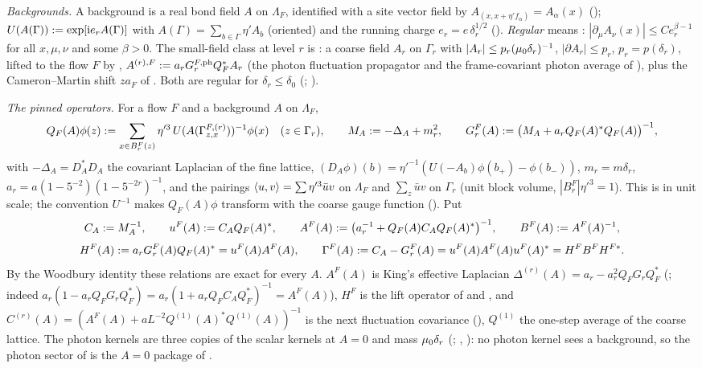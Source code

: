 \emph{Backgrounds.} A background is a real bond field $A$ on $\Lambda_F$, identified with a site vector field by $A_{(x,x+\eta'f_\alpha)}=A_\alpha(x)$ (\cite[p.~652]{K1}); $U(A(\Gamma)):=\exp[\mathrm ie_rA(\Gamma)]$ with $A(\Gamma)=\sum_{b\in\Gamma}\eta'A_b$ (oriented) and the running charge $e_r=e\,\delta_r^{1/2}$ (\cite[(3.22)]{K1}). \emph{Regular} means \cite[Def.~3.2]{K1}: $|\partial_\mu A_\nu(x)|\le Ce_r^{\beta-1}$ for all $x,\mu,\nu$ and some $\beta>0$. The small-field class at level $r$ is \cite[(3.2)]{K1}: a coarse field $A_r$ on $\Gamma_r$ with $|A_r|\le p_r(\mu_0\delta_r)^{-1}$, $|\partial A_r|\le p_r$, $p_r=p(\delta_r)$, lifted to the flow $F$ by \cite[(2.18)]{K1}, $A^{(r),F}:= a_rG^{F,\mathrm{ph}}_rQ_F^*A_r$ (the photon fluctuation propagator and the frame-covariant photon average of ), plus the Cameron--Martin shift $za_F$ of . Both are regular for $\delta_r\le\delta_0$ (\cite[(3.45)]{K1}; ).

\emph{The pinned operators.} For a flow $F$ and a background $A$ on $\Lambda_F$,
\[
Q_F(A)\phi(z):=\sum_{x\in B^F_r(z)}\eta'^3\,U(A(\Gamma^{F,(r)}_{z,x}))^{-1}\phi(x)\quad(z\in\Gamma_r),\qquad
M_A:=-\Delta_A+m_r^2,\qquad G^F_r(A):=\big(M_A+a_rQ_F(A)^*Q_F(A)\big)^{-1},
\]
with $-\Delta_A=D_A^*D_A$ the covariant Laplacian of the fine lattice, $(D_A\phi)(b)=\eta'^{-1}(U(-A_b)\phi(b_+)-\phi(b_-))$, $m_r=m\delta_r$, $a_r=a(1-5^{-2})(1-5^{-2r})^{-1}$, and the pairings $\langle u,v\rangle=\sum\eta'^3\bar uv$ on $\Lambda_F$ and $\sum_z\bar uv$ on $\Gamma_r$ (unit block volume, $|B^F_r|\eta'^3=1$). This is \cite[(2.11), (2.13)]{K1} in unit scale; the convention $U^{-1}$ makes $Q_F(A)\phi$ transform with the coarse gauge function (). Put
\[
C_A:= M_A^{-1},\qquad u^F(A):= C_AQ_F(A)^*,\qquad A^F(A):=\big(a_r^{-1}+Q_F(A)C_AQ_F(A)^*\big)^{-1},\qquad B^F(A):= A^F(A)^{-1},
\]
\[
H^F(A):= a_rG^F_r(A)Q_F(A)^*=u^F(A)A^F(A),\qquad \Gamma^F(A):= C_A-G^F_r(A)=u^F(A)A^F(A)u^F(A)^*=H^FB^FH^{F*}.
\]
By the Woodbury identity these relations are exact for every $A$. $A^F(A)$ is King's effective Laplacian $\Delta^{(r)}(A)=a_r-a_r^2Q_FG_rQ_F^*$ (\cite[(2.14)]{K1}; indeed $a_r(1-a_rQ_FG_rQ_F^*)=a_r(1+a_rQ_FC_AQ_F^*)^{-1}=A^F(A)$), $H^F$ is the lift operator of \cite[(2.18)]{K1} and , and $C^{(r)}(A)=(A^F(A)+aL^{-2}Q^{(1)}(A)^*Q^{(1)}(A))^{-1}$ is the next fluctuation covariance (\cite[(2.16)]{K1}), $Q^{(1)}$ the one-step average of the coarse lattice. The photon kernels are three copies of the scalar kernels at $A=0$ and mass $\mu_0\delta_r$ (\cite[p.~654]{K1}; , ): no photon kernel sees a background, so the photon sector of  is the $A=0$ package of .

